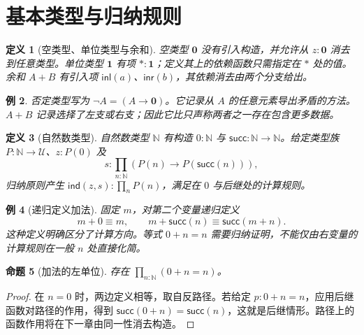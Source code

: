\documentclass[12pt,oneside,openany,fontset=none]{ctexbook}
\theoremstyle{cn}
\newtheorem{definition}{定义}[chapter]
\newtheorem{example}[definition]{例}
\newtheorem{proposition}[definition]{命题}
\numberwithin{equation}{chapter}
\newcommand{\U}{\mathcal U}
\newcommand{\one}{\mathbf 1}
\newcommand{\zero}{\mathbf 0}
\newcommand{\N}{\mathbb N}
\begin{document}
\section{基本类型与归纳规则}
\begin{definition}[空类型、单位类型与余和]
空类型 $\zero$ 没有引入构造，并允许从 $z:\zero$ 消去到任意类型。单位类型 $\one$ 有项 $*:\one$；定义其上的依赖函数只需指定在 $*$ 处的值。余和 $A+B$ 有引入项 $\mathsf{inl}(a)$、$\mathsf{inr}(b)$，其依赖消去由两个分支给出。
\end{definition}
\begin{example}
否定类型写为 $\neg A=(A\to\zero)$。它记录从 $A$ 的任意元素导出矛盾的方法。$A+B$ 记录选择了左支或右支；因此它比只声称两者之一存在包含更多数据。
\end{example}
\begin{definition}[自然数类型]
自然数类型 $\N$ 有构造 $0:\N$ 与 $\mathsf{succ}:\N\to\N$。给定类型族 $P:\N\to\U$、$z:P(0)$ 及
\[
s:\prod_{n:\N}(P(n)\to P(\mathsf{succ}(n))),
\]
归纳原则产生 $\mathsf{ind}(z,s):\prod_nP(n)$，满足在 $0$ 与后继处的计算规则。
\end{definition}
\begin{example}[递归定义加法]
固定 $m$，对第二个变量递归定义
\[
m+0\equiv m,
\qquad m+\mathsf{succ}(n)\equiv\mathsf{succ}(m+n).
\]
这种定义明确区分了计算方向。等式 $0+n=n$ 需要归纳证明，不能仅由右变量的计算规则在一般 $n$ 处直接化简。
\end{example}
\begin{proposition}[加法的左单位]
存在 $\prod_{n:\N}(0+n=n)$。
\end{proposition}
\begin{proof}
在 $n=0$ 时，两边定义相等，取自反路径。若给定 $p:0+n=n$，应用后继函数对路径的作用，得到
$\mathsf{succ}(0+n)=\mathsf{succ}(n)$，这就是后继情形。路径上的函数作用将在下一章由同一性消去构造。
\end{proof}
\end{document}
